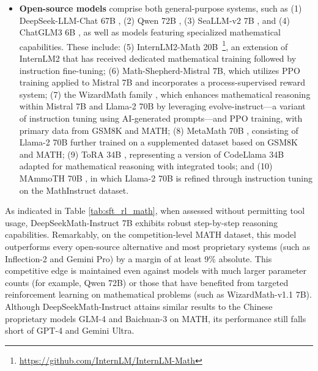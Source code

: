 \begin{itemize}[topsep=0pt]
\begin{itemize}[topsep=0pt]
\begin{itemize}[topsep=0pt]
    \item \textbf{Closed-source models} comprise the following: (1) the GPT series, with GPT-4 \citep{gpt4} and GPT-4 Code Interpreter~\footnote{\url{https://openai.com/blog/chatgpt-plugins\#\#code-interpreter}} standing out as the most advanced; (2) Gemini Ultra and Pro \citep{gemini}; (3) Inflection-2 \citep{inflection-2}; (4) Grok-1~\footnote{\url{https://x.ai/model-card}}. In addition, recent contributions from Chinese technology firms include (5) Baichuan-3~\footnote{\url{https://www.baichuan-ai.com}} and (6) the most recent addition to the GLM family, GLM-4~\footnote{\url{https://open.bigmodel.cn/dev/api\#glm-4}} \citep{glm}.
\end{itemize}

These models are designed for broad applications, with the majority having undergone multiple alignment processes.

\item \textbf{Open-source models} comprise both general-purpose systems, such as (1) DeepSeek-LLM-Chat 67B \citep{deepseek-llm}, (2) Qwen 72B \citep{qwen}, (3) SeaLLM-v2 7B \citep{seallm}, and (4) ChatGLM3 6B \citep{chatglm3}, as well as models featuring specialized mathematical capabilities. These include: (5) InternLM2-Math 20B~\footnote{\url{https://github.com/InternLM/InternLM-Math}}, an extension of InternLM2 that has received dedicated mathematical training followed by instruction fine-tuning; (6) Math-Shepherd-Mistral 7B, which utilizes PPO training \citep{schulman2017proximal} applied to Mistral 7B \citep{mistral} and incorporates a process-supervised reward system; (7) the WizardMath family \citep{wizardmath}, which enhances mathematical reasoning within Mistral 7B and Llama-2 70B \citep{llama2} by leveraging evolve-instruct—a variant of instruction tuning using AI-generated prompts—and PPO training, with primary data from GSM8K and MATH; (8) MetaMath 70B \citep{metamath}, consisting of Llama-2 70B further trained on a supplemented dataset based on GSM8K and MATH; (9) ToRA 34B \cite{tora}, representing a version of CodeLlama 34B adapted for mathematical reasoning with integrated tools; and (10) MAmmoTH 70B \citep{MathInstruct}, in which Llama-2 70B is refined through instruction tuning on the MathInstruct dataset.
\end{itemize}

As indicated in Table \ref{tab:sft_rl_math}, when assessed without permitting tool usage, DeepSeekMath-Instruct 7B exhibits robust step-by-step reasoning capabilities. Remarkably, on the competition-level MATH dataset, this model outperforms every open-source alternative and most proprietary systems (such as Inflection-2 and Gemini Pro) by a margin of at least 9\% absolute. This competitive edge is maintained even against models with much larger parameter counts (for example, Qwen 72B) or those that have benefited from targeted reinforcement learning on mathematical problems (such as WizardMath-v1.1 7B). Although DeepSeekMath-Instruct attains similar results to the Chinese proprietary models GLM-4 and Baichuan-3 on MATH, its performance still falls short of GPT-4 and Gemini Ultra.


\end{itemize}
